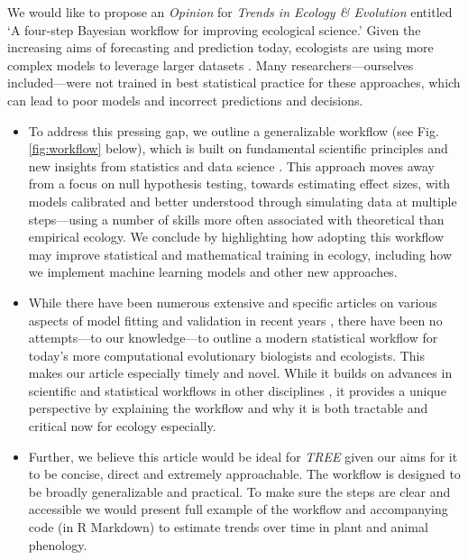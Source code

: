 \documentclass[11pt]{article}
\begin{document}
We would like to propose an \emph{Opinion} for \emph{Trends in Ecology \& Evolution} entitled `A four-step Bayesian workflow for improving ecological science.' %
Given the increasing aims of forecasting and prediction today, ecologists are using more complex models to leverage larger datasets \citep{anderson2021trends,muff2022rewriting}. Many researchers---ourselves included---were not trained in best statistical practice for these approaches, which can lead to poor models and incorrect predictions and decisions. %
\begin{itemize}
\item To address this pressing gap, we outline a generalizable workflow (see Fig. \ref{fig:workflow} below), which is built on fundamental scientific principles and new insights from statistics and data science \citep[][]{grinsztajn2021,vandeschoot2021}. This approach  moves away from a focus on null hypothesis testing, towards estimating effect sizes, with models calibrated and better understood through simulating data at multiple steps---using a number of skills more often associated with theoretical than empirical ecology. We conclude by highlighting how adopting this workflow may improve statistical and mathematical training in ecology, including how we implement machine learning models and other new approaches. 
\item While there have been numerous extensive and specific articles on various aspects of model fitting and validation in recent years \citep[e.g.][]{conn2018,gabryvis,tredennick2021practical,direnzo2023practical}, there have been no attempts---to our knowledge---to outline a modern statistical workflow for today's more computational evolutionary biologists and ecologists. This makes our article especially timely and novel. While it builds on advances in scientific and statistical workflows in other disciplines \citep{gelman2020bayesian,grinsztajn2021,schad2021}, it provides a unique perspective by explaining the workflow and why it is both tractable and critical now for ecology especially. 
\item Further, we believe this article would be ideal for \emph{TREE} given our aims for it to be concise, direct and extremely approachable. The workflow is designed to be broadly generalizable and practical. To make sure the steps are clear and accessible we would present full example of the workflow and accompanying code (in R Markdown) to estimate trends over time in plant and animal phenology. 
\end{itemize}
\end{document}
